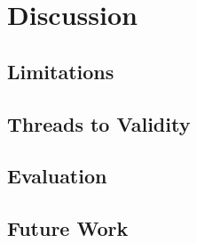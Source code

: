 
\chapter{Discussion}
\label{chapter:discussion}

\section{Limitations}
\label{sec:limitations}

\section{Threads to Validity}
\label{sec:threads-to-validity}

\section{Evaluation}
\label{sec:evaluation}

\section{Future Work}
\label{sec:future-work}